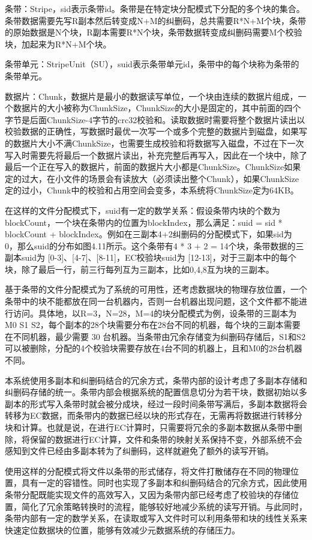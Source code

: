 条带：Stripe，sid表示条带id。条带是在特定块分配模式下分配的多个块的集合。条带数据需要先写R副本然后转变成N+M的纠删码，总共需要R*N+M个块，条带的原始数据是N个块，R副本需要R*N个块，条带数据转变成纠删码需要M个校验块，加起来为R*N+M个块。

条带单元：StripeUnit（SU），suid表示条带单元id，条带中的每个块称为条带的条带单元。

数据片：Chunk，数据片是最小的数据读写单位，一个块由连续的数据片组成，一个数据片的大小被称为ChunkSize，ChunkSize的大小是固定的，其中前面的四个字节是后面ChunkSize-4字节的crc32校验和。读取数据时需要将整个数据片读出以校验数据的正确性，写数据时最优一次写一个或多个完整的数据片到磁盘，如果写的数据片大小不满ChunkSize，也需要生成校验和将数据写入磁盘，不过在下一次写入时需要先将最后一个数据片读出，补充完整后再写入，因此在一个块中，除了最后一个正在写入的数据片，前面的数据片大小都是ChunkSize。ChunkSize如果定的过大，在小文件的场景会有读放大（必须读出整个Chunk），如果ChunkSize定的过小，Chunk中的校验和占用空间会变多，本系统将ChunkSize定为64KB。

在这样的文件分配模式下，suid有一定的数学关系：假设条带内块的个数为blockCount，一个块在条带内的位置为blockIndex，那么满足：suid = sid * blockCount + blockIndex。例如在三副本4+2纠删码的分配模式下，如果sid为 0，那么suid的分布如图4.11所示。这个条带有4 * 3 + 2 = 14个块，条带数据的三副本suid为 [0-3]、[4-7]、[8-11]，EC校验块suid为 [12-13]，对于三副本中的每个块，除了最后一行，前三行每列互为三副本，比如0,4,8互为块的三副本。

基于条带的文件分配模式为了系统的可用性，还考虑数据块的物理存放位置，一个条带中的块不能都放在同一台机器内，否则一台机器出现问题，这个文件都不能进行访问。具体地，以R=3，N=28，M=4的块分配模式为例，设条带的三副本为M0 S1 S2，每个副本的28个块需要分布在28台不同的机器，每个块的三副本需要在不同机器，最少需要 30 台机器。当条带由冗余存储变为纠删码存储后，S1和S2可以被删除，分配的4个校验块需要存放在4台不同的机器上，且和M0的28台机器不同。

本系统使用多副本和纠删码结合的冗余方式，条带内部的设计考虑了多副本存储和纠删码存储的统一。条带内部会根据系统的配置信息切分为若干块，数据初始以多副本的形式写入条带时就会被分成块，经过一段时间条带写满后，多副本数据将会转移为EC数据，而条带内的数据已经以块的形式存在，无需再将数据进行转移分块和计算。也就是说，在进行EC计算时，只需要将冗余的多副本数据从条带中删除，将保留的数据进行EC计算，文件和条带的映射关系保持不变，外部系统不会感知到文件已经由多副本转为了纠删码，这样就避免了额外的读写开销。

使用这样的分配模式将文件以条带的形式储存，将文件打散储存在不同的物理位置，具有一定的容错性。同时也实现了多副本和纠删码结合的冗余方式，因此使用条带分配既能实现文件的高效写入，又因为条带内部已经考虑了校验块的存储位置，简化了冗余策略转换时的流程，能够较好地减少系统的读写开销。与此同时，条带内部有一定的数学关系，在读取或写入文件时可以利用条带和块的线性关系来快速定位数据块的位置，能够有效减少元数据系统的存储压力。

